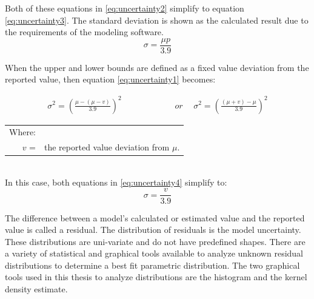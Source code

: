 Both of these equations in \ref{eq:uncertainty2} simplify to equation \ref{eq:uncertainty3}.  The standard deviation is shown as the calculated result due to the requirements of the modeling software.
\begin{equation}
\sigma = \frac{\mu p}{3.9}
\label{eq:uncertainty3}
\end{equation}

When the upper and lower bounds are defined as a fixed value deviation from the reported value, then equation \ref{eq:uncertainty1} becomes:

\begin{align}
	\sigma^2 = \left( \frac{\mu - (\mu - v)}{3.9} \right)^2  &  \phantom{wordsssssss} or \phantom{s}  & 	\sigma^2 = \left( \frac{(\mu + v) - \mu}{3.9} \right)^2 \label{eq:uncertainty4}
\end{align}
\begin{tabular}{r p{5.5in}}
	Where:\\
	$ v $ = & the reported value deviation from $ \mu $.\\
\end{tabular}\\

In this case, both equations in \ref{eq:uncertainty4} simplify to:
\begin{equation}
\sigma = \frac{v}{3.9}
\label{eq:uncertainty5}
\end{equation}

The difference between a model's calculated or estimated value and the reported value is called a residual.  The distribution of residuals is the model uncertainty.  These distributions are uni-variate and do not have predefined shapes.  There are a variety of statistical and graphical tools available to analyze unknown residual distributions to determine a best fit parametric distribution.  The two graphical tools used in this thesis to analyze distributions are the histogram and the kernel density estimate.

